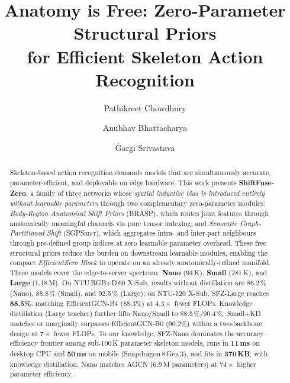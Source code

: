 \documentclass[sigconf,screen,review,anonymous]{acmart}
\begin{document}
\title{Anatomy is Free: Zero-Parameter Structural Priors\\
       for Efficient Skeleton Action Recognition}

\author{Pathikreet Chowdhury}

\author{Anubhav Bhattacharya}

\author{Gargi Srivastava}

\begin{abstract}
Skeleton-based action recognition demands models that are simultaneously
accurate, parameter-efficient, and deployable on edge hardware.
This work presents \textbf{ShiftFuse-Zero}, a family of three networks whose
\emph{spatial inductive bias is introduced entirely without learnable parameters}
through two complementary zero-parameter modules:
\emph{Body-Region Anatomical Shift Priors} (\textsc{BRASP}), which routes
joint features through anatomically meaningful channels via pure tensor
indexing, and \emph{Semantic Graph-Partitioned Shift} (\textsc{SGPShift}),
which aggregates intra- and inter-part neighbours through pre-defined group
indices at zero learnable parameter overhead.
These free structural priors reduce the burden on downstream learnable modules,
enabling the compact \emph{EfficientZero Block} to operate on an already
anatomically-refined manifold.
Three models cover the edge-to-server spectrum: \textbf{Nano} (94\,K),
\textbf{Small} (281\,K), and \textbf{Large} (1.18\,M).
On NTU\,RGB+D\,60 X-Sub, results without distillation are 86.2\,\% (Nano),
88.8\,\% (Small), and 92.5\,\% (Large); on NTU-120 X-Sub, SFZ-Large reaches
\textbf{88.5\%}, matching EfficientGCN-B4 (88.3\%) at $4.3{\times}$ fewer FLOPs.
Knowledge distillation (Large teacher) further lifts Nano/Small to 88.5\,\%/90.4\,\%;
Small+KD matches or marginally surpasses EfficientGCN-B0 (90.2\%)
within a two-backbone design at $7{\times}$ fewer FLOPs.
To our knowledge, SFZ-Nano dominates the accuracy--efficiency frontier
among sub-100\,K parameter skeleton models, runs in \textbf{11\,ms} on desktop CPU
and \textbf{50\,ms} on mobile (Snapdragon\,8\,Gen\,3), and fits in \textbf{370\,KB};
with knowledge distillation, Nano matches AGCN (6.9\,M parameters) at
$74{\times}$ higher parameter efficiency.
\end{abstract}
\end{document}

